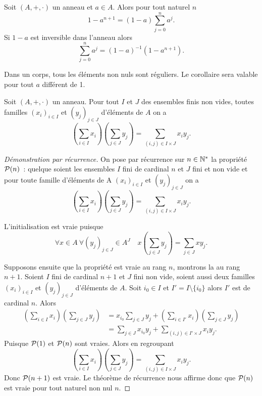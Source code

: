 \begin{corth}
  Soit \((A,+,\cdot)\) un anneau et \(a \in A\). Alors pour tout naturel \(n\)
  \begin{equation}
    1-a^{n+1}=(1-a)\sum_{j=0}^n a^j.
  \end{equation}
  Si \(1-a\) est inversible dans l'anneau alors
  \begin{equation}
    \sum_{j=0}^n a^j = (1-a)^{-1}(1-a^{n+1}).
  \end{equation}
\end{corth}
Dans un corps, tous les éléments non nuls sont réguliers. Le corollaire sera 
valable pour tout \(a\) différent de 1.

\begin{theo}
  Soit \((A,+,\cdot)\) un anneau. Pour tout \(I\) et \(J\) des ensembles finis 
  non vides, toutes familles \((x_i)_{i \in I}\) et \((y_j)_{j \in J}\) 
  d'éléments de \(A\) on a
  \begin{equation}
    \left(\sum_{i \in I} x_i \right)\left(\sum_{j \in J} y_j \right) = 
    \sum_{(i,j)\in I\times J} x_iy_j.
  \end{equation}
\end{theo}
\begin{proof}[Démonstration par récurrence]
  On pose par récurrence sur \(n \in \N^*\) la propriété \(\P(n)\)~: quelque 
  soient les ensembles \(I\) fini de cardinal \(n\) et \(J\) fini et non vide et 
  pour toute famille d'éléments de A \((x_i)_{i \in I}\) et \((y_j)_{j \in J}\) 
  on a
  \begin{equation} \left(\sum_{i \in I} x_i \right)\left(\sum_{j \in J} y_j 
    \right) = \sum_{(i,j)\in I\times J} x_iy_j.
  \end{equation}

  L'initialisation est vraie puisque
  \begin{equation}
    \forall x \in A \ \forall (y_j)_{j \in J} \in A^J \quad x \left(\sum_{j \in 
    J} y_j \right) = \sum_{j \in J} xy_j.
  \end{equation}

  Supposons ensuite que la propriété est vraie au rang \(n\), montrons la au 
  rang \(n+1\). Soient \(I\) fini de cardinal \(n+1\) et \(J\) fini non vide, 
  soient aussi deux familles \((x_i)_{i \in I}\) et \((y_j)_{j \in J}\) 
  d'éléments de \(A\). Soit \(i_0 \in I\) et \(I'=I\setminus\{i_0\}\) alors 
  \(I'\) est de cardinal \(n\). Alors
  \begin{align}
    \left(\sum_{i \in I} x_i \right)\left(\sum_{j \in J} y_j \right) &=x_{i_0} 
    \sum_{j \in J} y_j + \left(\sum_{i \in I'} x_i \right)\left(\sum_{j \in J} 
    y_j \right) \\
    &=\sum_{j \in J} x_{i_0}y_j +  \sum_{(i,j)\in I'\times J} x_iy_j.
  \end{align}
  Puisque \(\P(1)\) et \(\P(n)\) sont vraies. Alors en regroupant
  \begin{equation}
    \left(\sum_{i \in I} x_i \right)\left(\sum_{j \in J} y_j \right) = 
    \sum_{(i,j)\in I\times J} x_iy_j.
  \end{equation}
  Donc \(\P(n+1)\) est vraie. Le théorème de récurrence nous affirme donc que 
  \(\P(n)\) est vraie pour tout naturel non nul \(n\).
\end{proof}
